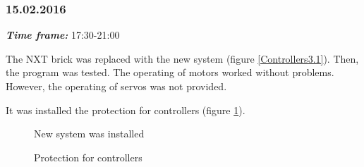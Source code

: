 \subsubsection{15.02.2016}
\textit{\textbf{Time frame:}} 17:30-21:00 

The NXT brick was replaced with the new system (figure \ref{Controllers3.1}). Then, the program was tested. The operating of motors worked without problems. However, the operating of servos was not provided.

It was installed the protection for controllers (figure \ref{Controllers3.2}).

\begin{figure}[H]
	\begin{minipage}[h]{0.47\linewidth}
		\caption{New system was installed}
		\label{Controllers3.1}
	\end{minipage}
	\hfill
	\begin{minipage}[h]{0.47\linewidth}
		\caption{Protection for controllers}
		\label{Controllers3.2}
	\end{minipage}
\end{figure}
